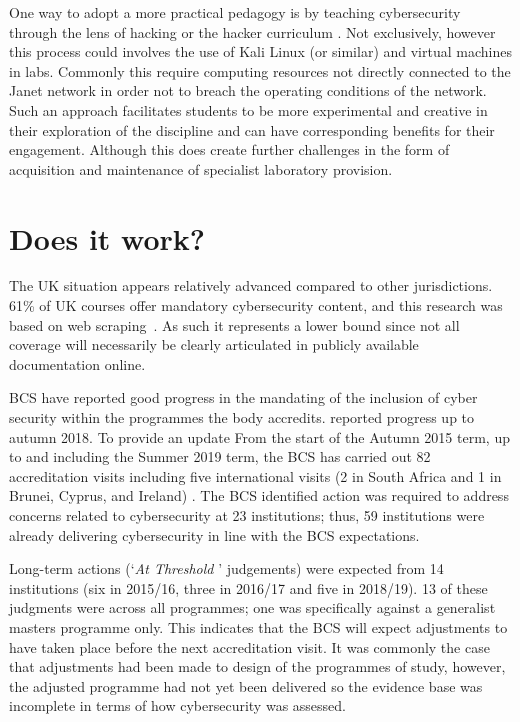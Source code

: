 \documentclass[sigconf]{acmart}
\begin{document}
One way to adopt a more practical pedagogy is by teaching cybersecurity through the lens of hacking or the hacker curriculum \cite{bratus2010teaching}. Not exclusively, however this process could involves the use of Kali Linux (or similar) and virtual machines in labs. Commonly this require computing resources not directly connected to the Janet network in order not to breach the operating conditions of the network. Such an approach facilitates students to be more experimental and creative in their exploration of the discipline and can have corresponding benefits for their engagement. Although this does create further challenges in the form of acquisition and maintenance of specialist laboratory provision.


\section {Does it work?}	
The UK situation appears relatively advanced compared to other jurisdictions. 61\% of UK courses offer mandatory cybersecurity content, and this research was based on web scraping~\cite[Table 1]{Ruiz2019a}. As such it represents a lower bound since not all coverage will necessarily be clearly articulated in publicly available documentation online.

BCS have reported good progress in the mandating of the inclusion of cyber security within the programmes the body accredits. \cite{Cricketal2019} reported progress up to  autumn 2018. To provide an update From the start of the Autumn 2015 term, up to and including the Summer 2019 term, the BCS has carried out 82 accreditation visits including five international visits (2 in South Africa and 1 in Brunei, Cyprus, and Ireland) . The BCS identified action was required to address concerns related to cybersecurity at 23 institutions; thus, 59 institutions were already delivering cybersecurity in line with the BCS expectations.

Long-term actions (`{\emph{At Threshold }}' judgements) were expected from 14 institutions (six in 2015/16, three in 2016/17 and five in 2018/19). 13 of these judgments were across all programmes; one was specifically against a generalist masters programme only. This indicates that the BCS will expect adjustments to have taken place before the next accreditation visit. It was commonly the case that adjustments had been made to design of the programmes of study, however, the adjusted programme had not yet been delivered so the evidence base was incomplete in terms of how cybersecurity was assessed.
\end{document}
